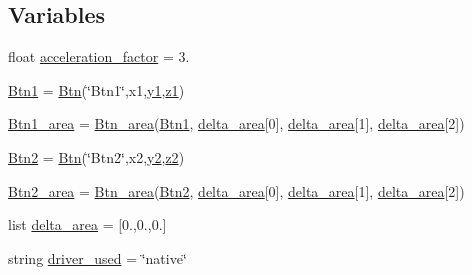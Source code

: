 \subsection*{Variables}
\begin{DoxyCompactItemize}
\item 
float \hyperlink{namespaceRET__config_a425bc201cf7b10f0c4f1068f752e7c9b}{acceleration\+\_\+factor} = 3.
\item 
\hyperlink{namespaceRET__config_af037c6b9ff0314103d8127acc9d07e0b}{Btn1} = \hyperlink{classRET__config_1_1Btn}{Btn}(\char`\"{}Btn1\char`\"{},x1,\hyperlink{namespaceRET__config_a9fe80bf4738047a31d7c162807ed85f0}{y1},\hyperlink{namespaceRET__config_a7da4886c0a2e03b8bb9ed62eb20efb78}{z1})
\item 
\hyperlink{namespaceRET__config_a118140d2896d1aff1e3c9355f9deb314}{Btn1\+\_\+area} = \hyperlink{classRET__config_1_1Btn__area}{Btn\+\_\+area}(\hyperlink{namespaceRET__config_af037c6b9ff0314103d8127acc9d07e0b}{Btn1}, \hyperlink{namespaceRET__config_abbf3fd8fafae6a457e57109bfaf9a6c5}{delta\+\_\+area}\mbox{[}0\mbox{]}, \hyperlink{namespaceRET__config_abbf3fd8fafae6a457e57109bfaf9a6c5}{delta\+\_\+area}\mbox{[}1\mbox{]}, \hyperlink{namespaceRET__config_abbf3fd8fafae6a457e57109bfaf9a6c5}{delta\+\_\+area}\mbox{[}2\mbox{]})
\item 
\hyperlink{namespaceRET__config_a73afa8c52cebd94e1889df5fbe3bec66}{Btn2} = \hyperlink{classRET__config_1_1Btn}{Btn}(\char`\"{}Btn2\char`\"{},x2,\hyperlink{namespaceRET__config_a07bcd014e69eddcf4243b2a961014eaf}{y2},\hyperlink{namespaceRET__config_a55196b87940893e540ba636218f4eb07}{z2})
\item 
\hyperlink{namespaceRET__config_a51a4083768cbc17b22a98ad63a7bf851}{Btn2\+\_\+area} = \hyperlink{classRET__config_1_1Btn__area}{Btn\+\_\+area}(\hyperlink{namespaceRET__config_a73afa8c52cebd94e1889df5fbe3bec66}{Btn2}, \hyperlink{namespaceRET__config_abbf3fd8fafae6a457e57109bfaf9a6c5}{delta\+\_\+area}\mbox{[}0\mbox{]}, \hyperlink{namespaceRET__config_abbf3fd8fafae6a457e57109bfaf9a6c5}{delta\+\_\+area}\mbox{[}1\mbox{]}, \hyperlink{namespaceRET__config_abbf3fd8fafae6a457e57109bfaf9a6c5}{delta\+\_\+area}\mbox{[}2\mbox{]})
\item 
list \hyperlink{namespaceRET__config_abbf3fd8fafae6a457e57109bfaf9a6c5}{delta\+\_\+area} = \mbox{[}0.,0.,0.\mbox{]}
\item 
string \hyperlink{namespaceRET__config_af06655663f692a853833001d611f908d}{driver\+\_\+used} = \char`\"{}native\char`\"{}
\item 

\end{DoxyCompactItemize}
